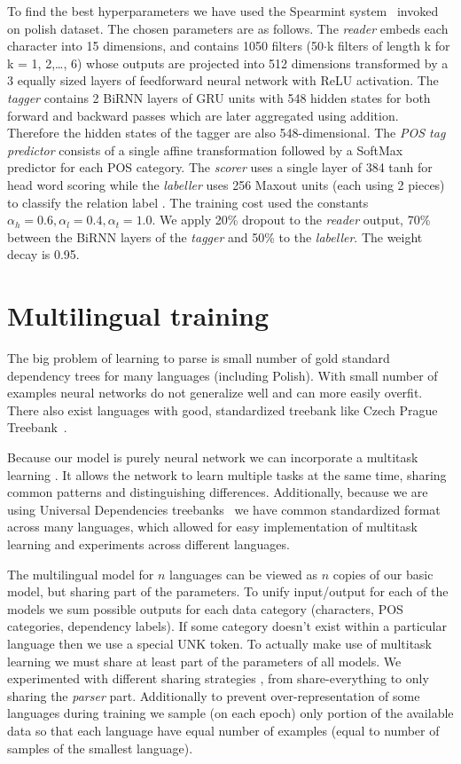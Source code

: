To find the best hyperparameters we have used the Spearmint system~\cite{snoek_practical_2012}
invoked on polish dataset. The chosen parameters are as follows.
The \emph{reader} embeds each character into 15 dimensions, and
contains 1050 filters (50$\cdot$k filters of length k for k = 1, 2,\dots, 6) 
whose outputs are projected into 512 dimensions transformed by a 3 equally
sized layers of feedforward neural network with ReLU activation.
The \emph{tagger} contains 2 BiRNN layers of GRU units with 548 hidden
states for both forward and backward passes which are later aggregated using
addition. Therefore the hidden states of the tagger are also 548-dimensional.
The \emph{POS tag predictor} consists of a single affine transformation
followed by a SoftMax predictor for each POS category.
The \emph{scorer} uses a single layer of 384 tanh for head word
scoring while the \emph{labeller} uses 256 Maxout units
(each using 2 pieces) to classify the relation label
\cite{goodfellow_maxout_2013}. The training cost used the constants
$\alpha_h=0.6, \alpha_l=0.4, \alpha_t=1.0$.
We apply 20\% dropout to the \emph{reader} output, 70\% between the BiRNN
layers of the \emph{tagger} and 50\% to the \emph{labeller}. The weight
decay is 0.95. %

\section{Multilingual training} \label{sec:neural_multilingual}
The big problem of learning to parse is small number of gold standard dependency
trees for many languages (including Polish). With small number of examples
neural networks do not generalize well and can more easily overfit.
There also exist languages with good, standardized treebank like Czech Prague
Treebank~\cite{prague_treebank}.

Because our model is purely neural network we can incorporate a multitask learning
\cite{caruana_multitask_learning}. It allows the network to learn multiple tasks
at the same time, sharing common patterns and distinguishing differences.
Additionally, because we are using Universal Dependencies treebanks~\cite{nivre_universal_2015}
we have common standardized format across many languages, which allowed for
easy implementation of multitask learning and experiments across different languages.

The multilingual model for $n$ languages can be viewed as $n$ copies of our
basic model, but sharing part of the parameters. To unify input/output for each
of the models we sum possible outputs for each data category (characters,
POS categories, dependency labels). If some category doesn't exist within
a particular language then we use a special UNK token. 
To actually make use of multitask learning we must share at least part of the
parameters of all models. We experimented with different sharing strategies
, from share-everything to only sharing the  \textit{parser} part. Additionally
to prevent over-representation of some
languages during training we sample (on each epoch) only portion of the available
data so that each language have equal number of examples (equal to number of samples
of the smallest language).

